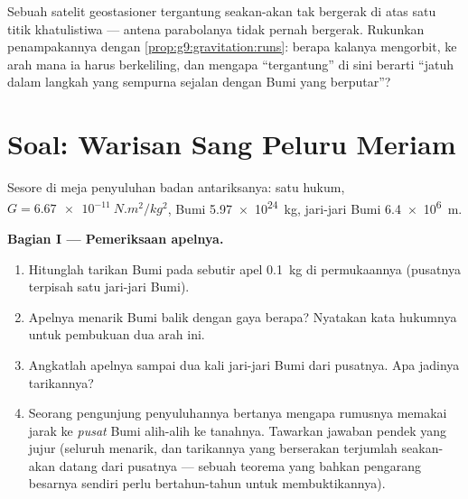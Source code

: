 \begin{exercise}[$\star\star\star$]\label{exo:g9:gravitation:12}
Sebuah satelit geostasioner tergantung seakan-akan tak bergerak di
atas satu titik khatulistiwa --- antena parabolanya tidak pernah
bergerak. Rukunkan penampakannya dengan
\cref{prop:g9:gravitation:runs}: berapa kalanya mengorbit, ke arah
mana ia harus berkeliling, dan mengapa ``tergantung'' di sini berarti
``jatuh dalam langkah yang sempurna sejalan dengan Bumi yang
berputar''?
\end{exercise}

\section{Soal: Warisan Sang Peluru Meriam}

\begin{problem}\label{pb:g9:gravitation:1}
Sesore di meja penyuluhan badan antariksanya: satu hukum,
$G = \qty{6.67e-11}{N.m^2/kg^2}$,  Bumi
\qty{5.97e24}{kg}, jari-jari Bumi \qty{6.4e6}{m}.

\medskip\noindent\textbf{Bagian I --- Pemeriksaan apelnya.}
\begin{enumerate}
  \item Hitunglah tarikan Bumi pada sebutir apel \qty{0.1}{kg} di
        permukaannya (pusatnya terpisah satu jari-jari Bumi).
  \item Apelnya menarik Bumi balik dengan gaya berapa? Nyatakan kata
        hukumnya untuk pembukuan dua arah ini.
  \item Angkatlah apelnya sampai dua kali jari-jari Bumi dari
        pusatnya. Apa jadinya tarikannya?
  \item Seorang pengunjung penyuluhannya bertanya mengapa rumusnya
        memakai jarak ke \emph{pusat} Bumi alih-alih ke tanahnya.
        Tawarkan jawaban pendek yang jujur (seluruh 
        menarik, dan tarikannya yang berserakan terjumlah seakan-akan
        datang dari pusatnya --- sebuah teorema yang bahkan pengarang
        besarnya sendiri perlu bertahun-tahun untuk membuktikannya).
\end{enumerate}


\end{problem}
